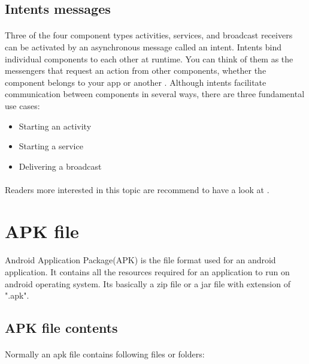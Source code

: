 \documentclass[../main.tex]{subfile}
\begin{document}
		\subsection{Intents messages}\label{sec:intents}
			\paragraph{} Three of the four component types activities, services, and broadcast receivers can be activated by an asynchronous message called an intent. Intents bind individual components to each other at runtime. You can think of them as the messengers that request an action from other components, whether the component belongs to your app or another \cite{app_fundamentals}. Although intents facilitate communication between components in several ways, there are three fundamental use cases:
				\begin{itemize}
					\item Starting an activity
					\item Starting a service
					\item Delivering a broadcast
				\end{itemize}
			\paragraph{} Readers more interested in this topic are recommend to have a look at \cite{intents}.
			
			
	\section{APK file}\label{sec:apk}	
		\paragraph{} Android Application Package(APK) is the file format used for an android application. It contains all the resources required for an application to run on android operating system. Its basically a zip file or a jar file with extension of ".apk"\cite{APK_structure}.
		
		\subsection{APK file contents} \label{sec:apk_file_contents}
		\paragraph{} Normally an apk file contains following files or folders:
		
\end{document}
